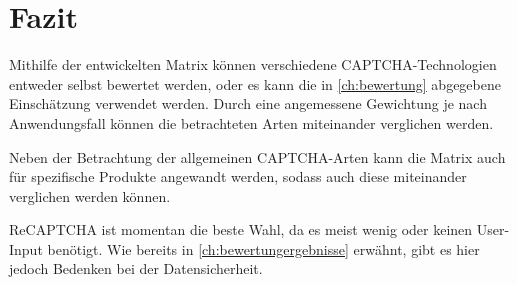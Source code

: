 \chapter{Fazit}

Mithilfe der entwickelten Matrix können verschiedene CAPTCHA-Technologien entweder selbst bewertet werden,
oder es kann die in \autoref{ch:bewertung} abgegebene Einschätzung verwendet werden.
Durch eine angemessene Gewichtung je nach Anwendungsfall können die betrachteten Arten miteinander verglichen werden.

Neben der Betrachtung der allgemeinen CAPTCHA-Arten kann die Matrix auch für spezifische Produkte angewandt werden,
sodass auch diese miteinander verglichen werden können.

ReCAPTCHA ist momentan die beste Wahl, da es meist wenig oder keinen User-Input benötigt.
Wie bereits in \autoref{ch:bewertungergebnisse} erwähnt, gibt es hier jedoch Bedenken bei der Datensicherheit.
